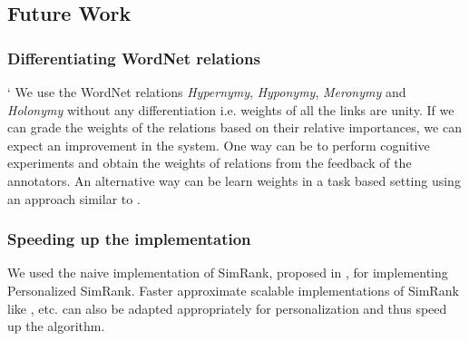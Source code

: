 \subsection{Future Work}

\subsubsection{Differentiating WordNet relations}`
We use the WordNet relations \textit{Hypernymy}, \textit{Hyponymy}, \textit{Meronymy} and \textit{Holonymy} without any differentiation i.e. weights of all the links are unity. If we can grade the weights of the relations based on their relative importances, we can expect an improvement in the system. One way can be to perform cognitive experiments and obtain the weights of relations from the feedback of the annotators. An alternative way can be learn weights in a task based setting using an approach similar to \citep{Navigli05SSI}.

\subsubsection{Speeding up the implementation}
We used the naive implementation of SimRank, proposed in \citep{Jeh02simrank}, for implementing Personalized SimRank. Faster approximate scalable implementations of SimRank like \citep{FogarasSimRank}, \citep{LizorkinSimrank} etc. can also be adapted appropriately for personalization and thus speed up the algorithm.

